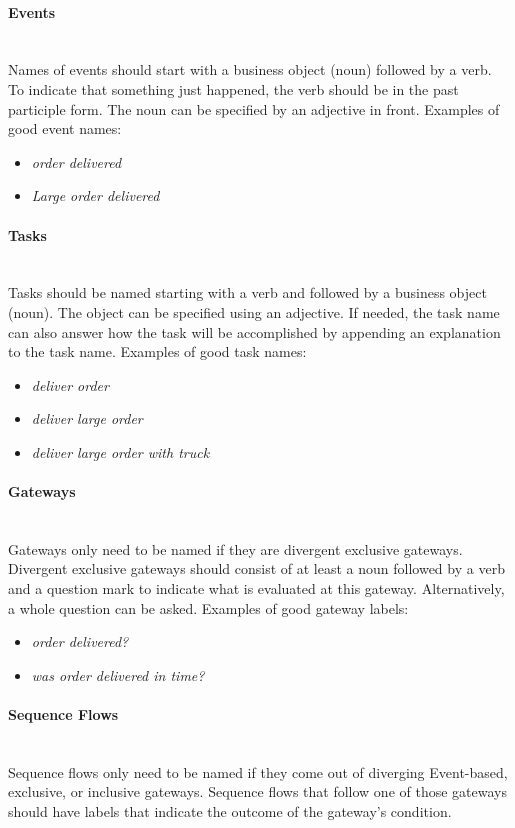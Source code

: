 \paragraph{Events}~\\
Names of events should start with a business object (noun) followed by a verb. To indicate that something just happened, the verb should be in the past participle form. The noun can be specified by an adjective in front. Examples of good event names: 
\begin{itemize}
	\item \textit{order delivered}
	\item \textit{Large order delivered}
\end{itemize}

\paragraph{Tasks}~\\
Tasks should be named starting with a verb and followed by a business object (noun). The object can be specified using an adjective. If needed, the task name can also answer how the task will be accomplished by appending an explanation to the task name. Examples of good task names:
\begin{itemize}
	\item \textit{deliver order}
	\item \textit{deliver large order}
	\item \textit{deliver large order with truck}
\end{itemize}

\paragraph{Gateways}~\\
Gateways only need to be named if they are divergent exclusive gateways. Divergent exclusive gateways should consist of at least a noun followed by a verb and a question mark to indicate what is evaluated at this gateway. Alternatively, a whole question can be asked. Examples of good gateway labels:
\begin{itemize}
	\item \textit{order delivered?}
	\item \textit{was order delivered in time?}
\end{itemize}

\paragraph{Sequence Flows}~\\
Sequence flows only need to be named if they come out of diverging Event-based, exclusive, or inclusive gateways. Sequence flows that follow one of those gateways should have labels that indicate the outcome of the gateway's condition. 

